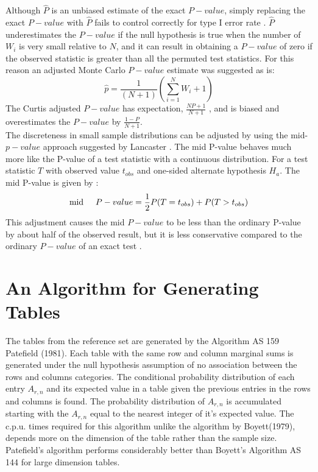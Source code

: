 \documentclass[12pt,oneside]{report}
\theoremstyle{definition}
\theoremstyle{mystyle}
\begin{document}
Although $\hat{P}$ is an unbiased estimate of the exact $P-value$, simply replacing the exact $P-value$ with $\hat{P}$ fails to control correctly  for type I error rate\cite{smythp} . $\hat{P}$ underestimates the $P-value$ if the null hypothesis is true when the number of $W_{i}$ is very small relative to $N$, and it can result in obtaining a $P-value$ of zero if the observed statistic is greater than all the permuted test statistics. For this reason an adjusted Monte Carlo $P-value$ estimate  was suggested  \cite{smyth} as
is:
\begin{equation}
\hat{p}=\frac{1}{(N+1)}\left(\sum\limits_{i=1}^{N}W_{i}+1\right)
\end{equation}
The  Curtis adjusted $P-value$  has expectation, $\frac{NP+1}{N+1}$ , and  is biased and overestimates the $P-value$ by  $\frac{1-P}{N+1}$.\\
The discreteness in small sample distributions can be adjusted by using the mid-$p-value$ approach suggested by 
Lancaster \cite{lancaster}. The mid P-value  behaves much more like the P-value of a test statistic with a continuous distribution. For a test statistic $T$ with observed value $t_{obs}$ and one-sided  alternate hypothesis $H_{a}$. The mid P-value is given by  :
\begin{equation*}
\text{mid} \hspace{5mm}P-value=\frac{1}{2}P(T=t_{obs})+P(T>t_{obs})
\end{equation*}
This adjustment causes the mid $P-value$ to be less than the ordinary P-value by about half of the observed result, but it is less conservative compared to the ordinary $P-value$ of an exact test \cite{Agresti2013}.\\

\section{An Algorithm for Generating Tables}
The tables from the reference set  are generated by the Algorithm AS 159 Patefield (1981). Each table with the same row and column marginal sums is generated under the  null hypothesis  assumption of no association between the rows and columns  categories. The conditional probability distribution of each entry $A_{r,n}$ and its expected value in a table given the previous entries in the rows and columns is found. The probability distribution of $A_{r,n}$ is accumulated starting with the $A_{r,n}$  equal to the nearest integer of it's expected value.
The c.p.u. times required for this algorithm unlike the algorithm by Boyett(1979), depends more  on the dimension of the table rather than the sample size.  Patefield's algorithm performs considerably better than Boyett's  Algorithm AS 144  for large dimension tables.
\end{document}
